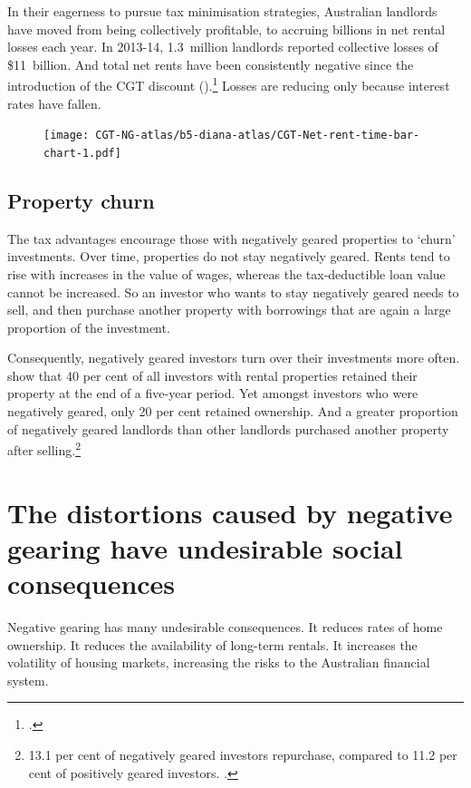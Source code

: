 In their eagerness to pursue tax minimisation strategies, Australian landlords have moved from being collectively profitable, to accruing billions in net rental losses each year.
In 2013-14, 1.3~million landlords reported collective losses of \$11~billion. 
And total net rents have been consistently negative since the introduction of the CGT discount ().\footcites{Eslake2013}{ATOTaxstats201314}  
Losses are reducing only because interest rates have fallen.

\begin{figure}[htbp]

\texttt{[image: CGT-NG-atlas/b5-diana-atlas/CGT-Net-rent-time-bar-chart-1.pdf]} %

\end{figure}

\subsection{Property churn}
The tax advantages encourage those with negatively geared properties to ‘churn’ investments. Over time, properties do not stay negatively geared. Rents tend to rise with increases in the value of wages, whereas the tax-deductible loan value cannot be increased.  So an investor who wants to stay negatively geared needs to sell, and then purchase another property with borrowings that are again a large proportion of the investment.

Consequently, negatively geared investors turn over their investments more often. 
\textcite[][28]{WoodOng2010} show that 40 per cent of all investors with rental properties retained their property at the end of a five-year period.  
Yet amongst investors who were negatively geared, only 20 per cent retained ownership. And a greater proportion of negatively geared landlords than other landlords purchased another property after selling.\footnote{13.1 per cent of negatively geared investors repurchase, compared to 11.2 per cent of positively geared investors. \textcite[][28]{WoodOng2010}.}  

\section{The distortions caused by negative gearing have undesirable social consequences}
Negative gearing has many undesirable consequences. It reduces rates of home ownership. 
It reduces the availability of long-term rentals. It increases the volatility of housing markets, increasing the risks to the Australian financial system. 

